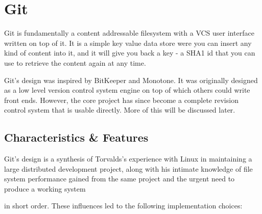 \section{Git}

Git is fundamentally a content addressable filesystem with a VCS user interface
written on top of it. It is a simple key value data store were you can insert
any kind of content into it, and it will give you back a key - a SHA1 id that
you can use to retrieve the content again at any time.

Git’s design was inspired\cite{inspiration} by BitKeeper and Monotone. It was
originally designed as a low level version control system engine on top of which
others could write front ends. However, the core project has since become a
complete revision control system that is usable directly. More of this will be
discussed later.

\subsection{Characteristics \& Features}

Git's design is a synthesis of Torvalds’s experience with Linux in maintaining a
large distributed development project, along with his intimate knowledge of file
system performance gained from the same project and the urgent need to produce a
working system

in short order. These influences led to the following implementation choices:

